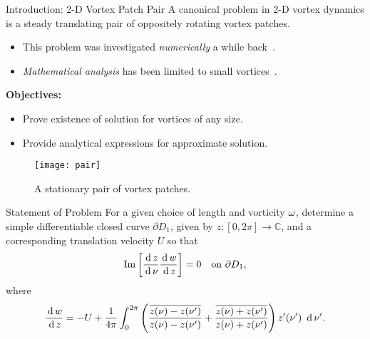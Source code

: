 \begin{block}{Introduction: 2-D Vortex Patch Pair}
  A canonical problem in 2-D vortex dynamics is a steady
  translating pair of oppositely rotating vortex patches.

  \begin{minipage}[t]{0.45\linewidth}
    \begin{itemize}
    \item This problem was investigated \textit{numerically} a while
      back~\cite{pierrehumbert}.
    \item \textit{Mathematical analysis} has been limited to small
      vortices~\cite{marchioro-pulvirenti}.
    \end{itemize}
    \textbf{Objectives:}
    \begin{itemize}
    \item Prove existence of solution for vortices of any size.
    \item Provide analytical expressions for approximate solution.
    \end{itemize}
  \end{minipage}
  \hfill
  \begin{minipage}[t]{0.55\linewidth}
    \begin{figure}[h]\label{fig:pair}
      \centering
      \texttt{[image: pair]}
      \caption{A stationary pair of vortex patches.}
    \end{figure}
  \end{minipage}
\end{block}

\begin{alertblock}{Statement of Problem}
  For a given choice of length and vorticity $\omega$, determine a simple
  differentiable closed curve $\partial D_1$, given by
  $z: [0, 2\pi] \rightarrow \mathbb{C}$, and a corresponding
  translation velocity $U$ so that
  \begin{equation}\label{eq:streamline}
    \operatorname{Im} \left[\frac{\operatorname{\,d} z}{\operatorname{\,d}\nu} \frac{\operatorname{\,d} w}{\operatorname{\,d} z} \right] = 0
    \quad\text{on $\partial D_1$,}
  \end{equation}
  where
  \begin{equation}\label{eq:dw/dz}
    \frac{\operatorname{\,d} w}{\operatorname{\,d} z}
    = -U + \frac{1}{4\pi} \int_{0}^{2\pi}
    \left(
      \frac{ \overline{z(\nu)-z(\nu')} }{ z(\nu)-z(\nu') }
      + \frac{ \overline{z(\nu)+z(\nu')} }{ z(\nu)+z(\nu') }
    \right)
    z'(\nu') \, \operatorname{\,d} \nu'.
  \end{equation}
\end{alertblock}

